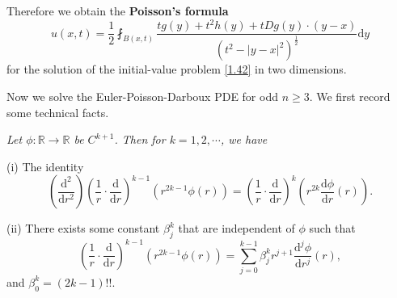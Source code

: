 Therefore we obtain the \textbf{Poisson's formula} 
$$
u\left( x,t \right) =\frac{1}{2}\fint_{B\left( x,t \right)}{\frac{tg\left( y \right) +t^2h\left( y \right) +tDg\left( y \right) \cdot \left( y-x \right)}{\left( t^2-\left| y-x \right|^2 \right) ^{\frac{1}{2}}}\mathrm{d}y}
$$
for the solution of the initial-value problem \eqref{1.42} in two dimensions.\par
Now we solve the Euler-Poisson-Darboux PDE for odd $n\ge 3$. We first record some technical facts.
\begin{lemma}\em\label{Lem1.4.2}
Let $\phi:\mathbb{R}\to\mathbb{R}$ be $C^{k+1}$. Then for $k=1,2,\cdots$, we have \par
(i) The identity 
$$
\left( \frac{\mathrm{d}^2}{\mathrm{d}r^2} \right) \left( \frac{1}{r}\cdot \frac{\mathrm{d}}{\mathrm{d}r} \right) ^{k-1}\left( r^{2k-1}\phi \left( r \right) \right) =\left( \frac{1}{r}\cdot \frac{\mathrm{d}}{\mathrm{d}r} \right) ^k\left( r^{2k}\frac{\mathrm{d}\phi}{\mathrm{d}r}\left( r \right) \right) .
$$\par
(ii) There exists some constant $\beta_j^k$ that are independent of $\phi$ such that 
$$
\left( \frac{1}{r}\cdot \frac{\mathrm{d}}{\mathrm{d}r} \right) ^{k-1}\left( r^{2k-1}\phi \left( r \right) \right) =\sum_{j=0}^{k-1}{\beta _{j}^{k}r^{j+1}\frac{\mathrm{d}^j\phi}{\mathrm{d}r^j}\left( r \right)},
$$
and $\beta_0^k=(2k-1)!!$.
\end{lemma}
